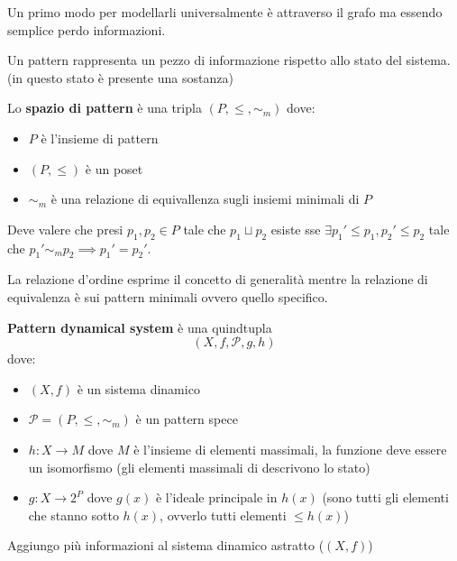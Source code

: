 Un primo modo per modellarli universalmente è attraverso il grafo ma essendo semplice 
perdo informazioni.
\begin{definizione}
\end{definizione}
Un pattern rappresenta un pezzo di informazione rispetto allo stato del sistema.
(in questo stato è presente una sostanza)
\begin{definizione}
    Lo \textbf{spazio di pattern} è una tripla $(P,\le, \sim_m)$ dove:
    \begin{itemize}
        \item $P$ è l'insieme di pattern
        \item $(P,\le)$ è un poset
        \item $\sim_m$ è una relazione di equivallenza sugli insiemi minimali di $P$
    \end{itemize}
    Deve valere che presi $p_1,p_2\in P$ tale che $p_1\sqcup p_2$ esiste sse $\exists
    p_1'\le p_1, p_2'\le p_2$ tale che $p_1'\sim_mp_2\implies p_1' = p_2'$.
\end{definizione}
La relazione d'ordine esprime il concetto di generalità mentre la relazione di equivalenza 
è sui pattern minimali ovvero quello specifico.


\begin{definizione}
    \textbf{Pattern dynamical system} è una quindtupla 
    $$(X, f, \mathcal{P},g, h)$$
    dove:
    \begin{itemize}
        \item $(X,f)$ è un sistema dinamico
        \item $\mathcal{P} = (P, \le, \sim_m)$ è un pattern spece
        \item $h:X\to M$ dove $M$ è l'insieme di elementi massimali, la funzione 
        deve essere un isomorfismo (gli elementi massimali di descrivono lo stato)
        \item $g:X\to 2^P$ dove $g(x)$ è l'ideale principale in $h(x)$ (sono tutti 
        gli elementi che stanno sotto $h(x)$, ovverlo tutti elementi $\le h(x)$)
    \end{itemize}
\end{definizione}

Aggiungo più informazioni al sistema dinamico astratto ($(X,f)$)

